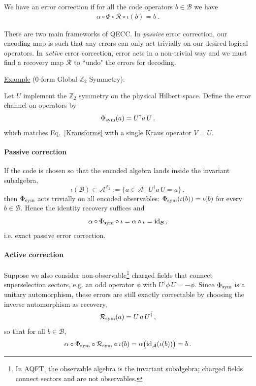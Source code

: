 \documentclass{article}
\newcommand{\mA}{\mathcal{A}}
\newcommand{\mB}{\mathcal{B}}
\theoremstyle{definition}
\begin{document}
  We have an error correction if for all the code operators $b\in \mB$ we have
  \begin{eqnarray}
    \alpha\circ\Phi\circ\mathcal{R}\circ\iota(b)=b\ .
  \end{eqnarray}

  There are two main frameworks of QECC. In \textit{passive} error correction, our
  encoding map is such that any errors can only act trivially on our desired logical
  operators. In \textit{active} error correction, error acts in a non-trivial
  way and we must find a recovery map $\mathcal{R}$ to ``undo" the errors for decoding.

  \underline{Example} (0-form Global $\mathbb{Z}_{2}$ Symmetry):

  Let $U$ implement the $\mathbb{Z}_{2}$ symmetry on the physical Hilbert space.
  Define the error channel on operators by
  \begin{equation}
    \Phi_{\rm sym}(a)=U^{\dagger}a\,U\,,
  \end{equation}
  which matches Eq.~\eqref{Krausforms} with a single Kraus operator $V=U$.

  \paragraph{Passive correction}
  If the code is chosen so that the encoded algebra lands inside the invariant
  subalgebra,
  \begin{equation}
    \iota(\mB)\subset \mA^{\mathbb{Z}_2}:=\{a\in\mA~|~U^{\dagger}a\,U=a\}\,,
  \end{equation}
  then $\Phi_{\rm sym}$ acts trivially on all encoded observables:
  $\Phi_{\rm sym}(\iota(b))=\iota(b)$ for every $b\in\mB$. Hence the identity recovery
  suffices and
  \begin{equation}
    \alpha\circ \Phi_{\rm sym}\circ \iota=\alpha\circ \iota=\mathrm{id}_{\mB}\,,
  \end{equation}
  i.e. exact passive error correction.

  \paragraph{Active correction}
  Suppose we also consider non-observable\footnote{In AQFT, the observable algebra
  is the invariant subalgebra; charged fields connect sectors and are not
  observables.} charged fields that connect superselection sectors, e.g. an odd
  operator $\phi$ with $U^{\dagger}\phi\,U=-\phi$. Since $\Phi_{\rm sym}$ is a unitary
  automorphism, these errors are still exactly correctable by choosing the
  inverse automorphism as recovery,
  \begin{equation}
    \mathcal{R}_{\rm sym}(a)=U\,a\,U^{\dagger}\,,
  \end{equation}
  so that for all $b\in\mB$,
  \begin{equation}
    \alpha\circ \Phi_{\rm sym}\circ \mathcal{R}_{\rm sym}\circ \iota(b) =\alpha \big
    (\mathrm{id}_{\mA}(\iota(b))\big)=b\,.
  \end{equation}
\end{document}
